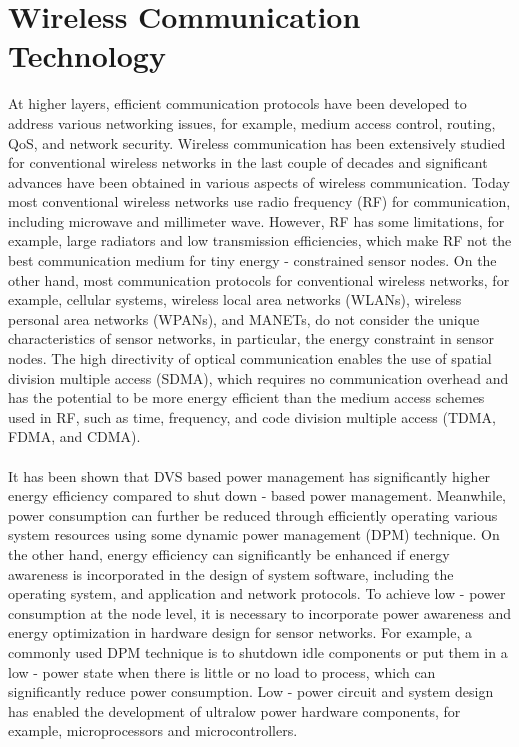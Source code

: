 \section{Wireless Communication Technology}
At higher layers, efficient communication protocols have been developed to address various networking issues, for example, medium access control, routing, QoS, and network security. Wireless communication has been extensively studied for conventional wireless networks in the last couple of decades and significant advances have been obtained in various aspects of wireless communication. Today most conventional wireless networks use radio frequency (RF) for communication, including microwave and millimeter wave. However, RF has some limitations, for example, large radiators and low transmission efficiencies, which make RF not the best communication medium for tiny energy - constrained sensor nodes. On the other hand, most communication protocols for conventional wireless networks, for example, cellular systems, wireless local area networks (WLANs), wireless personal area networks (WPANs), and MANETs, do not consider the unique characteristics of sensor networks, in particular, the energy constraint in sensor nodes. The high directivity of optical communication enables the use of spatial division multiple access (SDMA), which requires no communication overhead and has the potential to be more energy efficient than the medium access schemes used in RF, such as time, frequency, and code division multiple access (TDMA, FDMA, and CDMA).\\\\
It has been shown that DVS based power management has significantly higher energy efficiency compared to shut down - based power management. Meanwhile, power consumption can further be reduced through efficiently operating various system resources using some dynamic power management (DPM) technique. On the other hand, energy efficiency can significantly be enhanced if energy awareness is incorporated in the design of system software, including the operating system, and application and network protocols. To achieve low - power consumption at the node level, it is necessary to incorporate power awareness and energy optimization in hardware design for sensor networks. For example, a commonly used DPM technique is to shutdown idle components or put them in a low - power state when there is little or no load to process, which can significantly reduce power consumption. Low - power circuit and system design has enabled the development of ultralow power hardware components, for example, microprocessors and microcontrollers.

